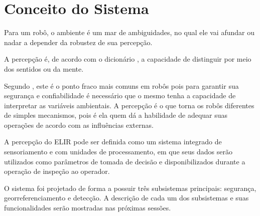 \chapter{Conceito do Sistema}
\label{chap:concep}

\begin{flushright}
   \begin{list}{}{
      \setlength{\leftmargin}{4.5cm}
      \setlength{\rightmargin}{0cm}
      \setlength{\labelwidth}{0pt}
      \setlength{\labelsep}{\leftmargin}}
      \item Para um robô, o ambiente é um mar de ambiguidades, no qual ele vai afundar ou nadar a depender da robustez de sua percepção.
      \begin{list}{}{
      \setlength{\leftmargin}{0cm}
      \setlength{\rightmargin}{0cm}
      \setlength{\labelwidth}{0pt}
      \setlength{\labelsep}{\leftmargin}}
      \item \cite{Fitzpatrick}
      \end{list}
   \end{list}
\end{flushright}

A percepção é, de acordo com o dicionário , a capacidade de distinguir por meio dos sentidos ou da mente.

Segundo , este é o ponto fraco mais comuns em robôs pois para garantir sua segurança e confiabilidade é necessário que o mesmo tenha a capacidade de interpretar as variáveis ambientais. A percepção é o que torna os robôs diferentes de simples mecanismos, pois é ela quem dá a habilidade de adequar suas operações de acordo com as influências externas.

A percepção do ELIR pode ser definida como um sistema integrado de sensoriamento e com unidades de processamento, em que seus dados serão utilizados como parâmetros de tomada de decisão e disponibilizados durante a operação de inspeção ao operador.

O sistema foi projetado de forma a possuir três subsistemas principais: segurança, georreferenciamento e detecção. A descrição de cada um dos subsistemas e suas funcionalidades serão mostradas nas próximas sessões.



